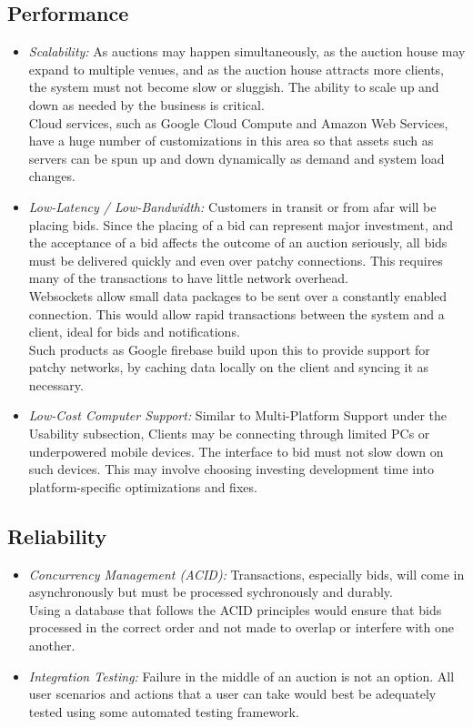 \documentclass[titlepage, 12pt]{extarticle}
\begin{document}
\subsection{Performance}
\begin{itemize}
\item {\it Scalability:} As auctions may happen simultaneously, as the auction house may expand to multiple venues, and as the auction house attracts more clients, the system must not become slow or sluggish. The ability to scale up and down as needed by the business is critical.
\\ Cloud services, such as Google Cloud Compute and Amazon Web Services, have a huge number of customizations in this area so that assets such as servers can be spun up and down dynamically as demand and system load changes.
\item {\it Low-Latency / Low-Bandwidth:} Customers in transit or from afar will be placing bids. Since the placing of a bid can represent major investment, and the acceptance of a bid affects the outcome of an auction seriously, all bids must be delivered quickly and even over patchy connections. This requires many of the transactions to have little network overhead.
\\Websockets allow small data packages to be sent over a constantly enabled connection. This would allow rapid transactions between the system and a client, ideal for bids and notifications. 
\\Such products as Google firebase build upon this to provide support for patchy networks, by caching data locally on the client and syncing it as necessary.
\item {\it Low-Cost Computer Support:} Similar to Multi-Platform Support under the Usability subsection, Clients may be connecting through limited PCs or underpowered mobile devices. The interface to bid must not slow down on such devices. This may involve choosing investing development time into platform-specific optimizations and fixes.
\end{itemize}
\subsection{Reliability}
\begin{itemize}
\item {\it Concurrency Management (ACID):} Transactions, especially bids, will come in asynchronously but must be processed sychronously and durably. 
\\Using a database that follows the ACID principles would ensure that bids processed in the correct order and not made to overlap or interfere with one another.
\item {\it Integration Testing:} Failure in the middle of an auction is not an option. All user scenarios and actions that a user can take would best be adequately tested using some automated testing framework.
\end{itemize}
\end{document}
